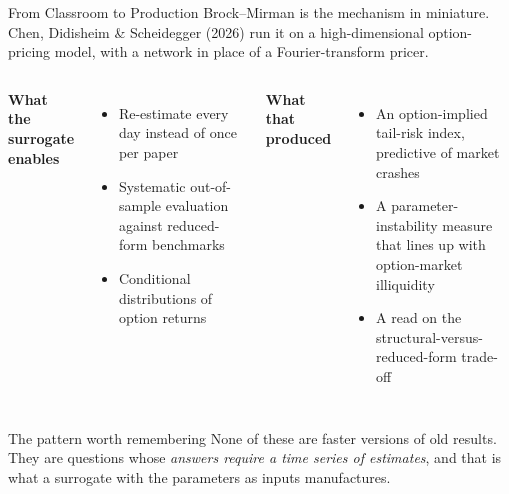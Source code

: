 \documentclass[aspectratio=169,11pt]{beamer}
\newcommand{\emphc}[1]{\textcolor{harvardcrimson}{#1}}
\begin{document}
\begin{frame}{From Classroom to Production}
\small
Brock--Mirman is the mechanism in miniature. Chen, Didisheim \& Scheidegger (2026) run it on a high-dimensional option-pricing model, with a network in place of a Fourier-transform pricer.

\vspace{0.2cm}
\begin{columns}[T]
\textbf{What the surrogate enables}
\begin{itemize}\itemsep1pt
  \item Re-estimate \emphc{every day} instead of once per paper
  \item Systematic out-of-sample evaluation against reduced-form benchmarks
  \item Conditional distributions of option returns
\end{itemize}

\textbf{What that produced}
\begin{itemize}\itemsep1pt
  \item An option-implied \emphc{tail-risk index}, predictive of market crashes
  \item A \emphc{parameter-instability} measure that lines up with option-market illiquidity
  \item A read on the structural-versus-reduced-form trade-off
\end{itemize}
\end{columns}

\vspace{0.25cm}
\begin{alertblock}{The pattern worth remembering}
None of these are faster versions of old results. They are questions whose \emph{answers require a time series of estimates}, and that is what a surrogate with the parameters as inputs manufactures.
\end{alertblock}
\end{frame}
\end{document}
